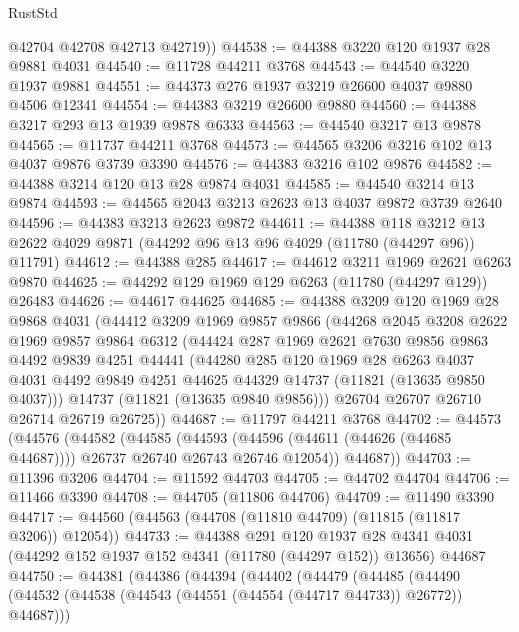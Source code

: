 \begin{lexlean}{RustStd}
\begin{coremodule}
        @42704
        @42708
        @42713
        @42719))
@44538 := @44388 @3220 @120 @1937 @28 @9881 @4031
@44540 := @11728 @44211 @3768
@44543 := @44540 @3220 @1937 @9881
@44551 := @44373 @276 @1937 @3219 @26600 @4037 @9880 @4506 @12341
@44554 := @44383 @3219 @26600 @9880
@44560 := @44388 @3217 @293 @13 @1939 @9878 @6333
@44563 := @44540 @3217 @13 @9878
@44565 := @11737 @44211 @3768
@44573 := @44565 @3206 @3216 @102 @13 @4037 @9876 @3739 @3390
@44576 := @44383 @3216 @102 @9876
@44582 := @44388 @3214 @120 @13 @28 @9874 @4031
@44585 := @44540 @3214 @13 @9874
@44593 := @44565 @2043 @3213 @2623 @13 @4037 @9872 @3739 @2640
@44596 := @44383 @3213 @2623 @9872
@44611 := @44388
    @118
    @3212
    @13
    @2622
    @4029
    @9871
    (@44292 @96 @13 @96 @4029 (@11780 (@44297 @96)) @11791)
@44612 := @44388 @285
@44617 := @44612 @3211 @1969 @2621 @6263 @9870
@44625 := @44292 @129 @1969 @129 @6263 (@11780 (@44297 @129)) @26483
@44626 := @44617 @44625
@44685 := @44388
    @3209
    @120
    @1969
    @28
    @9868
    @4031
    (@44412
      @3209
      @1969
      @9857
      @9866
      (@44268
        @2045
        @3208
        @2622
        @1969
        @9857
        @9864
        @6312
        (@44424
          @287
          @1969
          @2621
          @7630
          @9856
          @9863
          @4492
          @9839
          @4251
          @44441
          (@44280
            @285
            @120
            @1969
            @28
            @6263
            @4037
            @4031
            @4492
            @9849
            @4251
            @44625
            @44329
            @14737
            (@11821 (@13635 @9850 @4037)))
          @14737
          (@11821 (@13635 @9840 @9856)))
        @26704
        @26707
        @26710
        @26714
        @26719
        @26725))
@44687 := @11797 @44211 @3768
@44702 := @44573
    (@44576
      (@44582
        (@44585
          (@44593 (@44596 (@44611 (@44626 (@44685 @44687)))) @26737 @26740 @26743 @26746 @12054))
        @44687))
@44703 := @11396 @3206
@44704 := @11592 @44703
@44705 := @44702 @44704
@44706 := @11466 @3390
@44708 := @44705 (@11806 @44706)
@44709 := @11490 @3390
@44717 := @44560 (@44563 (@44708 (@11810 @44709) (@11815 (@11817 @3206)) @12054))
@44733 := @44388
    @291
    @120
    @1937
    @28
    @4341
    @4031
    (@44292 @152 @1937 @152 @4341 (@11780 (@44297 @152)) @13656)
    @44687
@44750 := @44381
    (@44386
      (@44394
        (@44402
          (@44479
            (@44485
              (@44490 (@44532 (@44538 (@44543 (@44551 (@44554 (@44717 @44733)) @26772)) @44687)))

\end{coremodule}
\end{lexlean}
